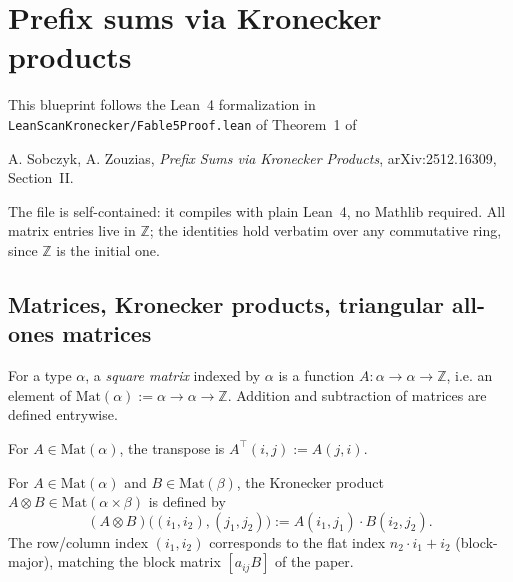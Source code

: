 \section{Prefix sums via Kronecker products}

This blueprint follows the Lean~4 formalization in
\texttt{LeanScanKronecker/Fable5Proof.lean} of Theorem~1 of

\begin{center}
A. Sobczyk, A. Zouzias, \emph{Prefix Sums via Kronecker Products},
arXiv:2512.16309, Section~II.
\end{center}

The file is self-contained: it compiles with plain Lean~4, no Mathlib
required. All matrix entries live in $\mathbb{Z}$; the identities hold
verbatim over any commutative ring, since $\mathbb{Z}$ is the initial one.

\subsection{Matrices, Kronecker products, triangular all-ones matrices}

\begin{definition}[Matrix]
  \label{def:Mat}
  \leanok
  For a type $\alpha$, a \emph{square matrix} indexed by $\alpha$ is a function
  $A : \alpha \to \alpha \to \mathbb{Z}$, i.e. an element of
  $\mathrm{Mat}(\alpha) := \alpha \to \alpha \to \mathbb{Z}$. Addition and
  subtraction of matrices are defined entrywise.
\end{definition}

\begin{definition}[Transpose]
  \label{def:transpose}
  \leanok
  For $A \in \mathrm{Mat}(\alpha)$, the transpose is
  $A^\top(i,j) := A(j,i)$.
\end{definition}

\begin{definition}
  \label{def:kron}
  \leanok
  For $A \in \mathrm{Mat}(\alpha)$ and $B \in \mathrm{Mat}(\beta)$, the
  Kronecker product $A \otimes B \in \mathrm{Mat}(\alpha \times \beta)$ is
  defined by
  \[
    (A \otimes B)\big((i_1,i_2),(j_1,j_2)\big) := A(i_1,j_1) \cdot B(i_2,j_2).
  \]
  The row/column index $(i_1,i_2)$ corresponds to the flat index
  $n_2 \cdot i_1 + i_2$ (block-major), matching the block matrix
  $[a_{ij} B]$ of the paper.
\end{definition}

